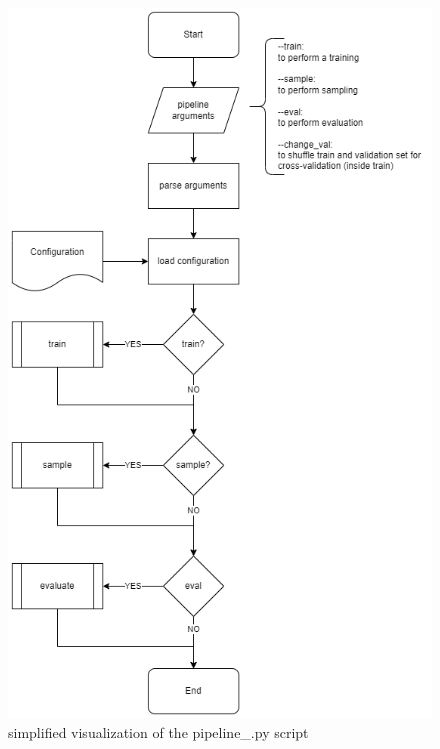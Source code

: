 \begin{figure}[H]
	\centering
	\includegraphics[width=\textwidth, height=0.7\textheight, keepaspectratio]{images/pipeline-ORIGINAL.png}
	\caption[Pipeline Script]{simplified visualization of the pipeline\_\*.py script}
\end{figure}
\newpage

